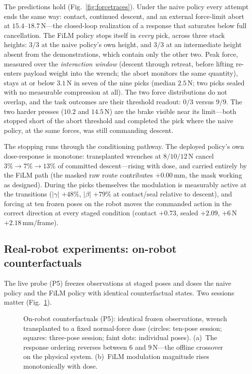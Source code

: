 The predictions hold (Fig.~\ref{fig:forcetraces}). Under the naive policy every attempt ends
the same way: contact, continued descent, and an external force-limit abort at
$15.4$--$18.7$\,N---the closed-loop realization of a response that saturates below full
cancellation. The FiLM policy stops itself in \emph{every} pick, across three stack
heights: $3/3$ at the naive policy's own height, and $3/3$ at an intermediate height absent
from the demonstrations, which contain only the other two. Peak force, measured over the
\emph{interaction window} (descent through retreat, before lifting re-enters payload weight
into the wrench; the abort monitors the same quantity), stays at or below $3.1$\,N in seven of
the nine picks (median $2.5$\,N; two picks sealed with no measurable compression at all). The
two force distributions do not overlap, and the task outcomes are their threshold readout:
$0/3$ versus $9/9$. The two harder presses ($10.2$ and $14.5$\,N) are the brake visible near
its limit---both stopped short of the abort threshold and completed the pick where the naive
policy, at the same forces, was still commanding descent.

The stopping runs through the conditioning pathway. The deployed policy's own dose-response is
monotone: transplanted wrenches at $8/10/12$\,N cancel $3\%\rightarrow7\%\rightarrow13\%$ of
committed descent---rising with dose, and carried entirely by the FiLM path (the masked raw
route contributes $+0.00$\,mm, the mask working as designed). During the picks themselves the
modulation is measurably active at the transitions ($|\gamma|$ $+48\%$, $|\beta|$ $+79\%$ at
contact/seal relative to descent), and forcing \chat{} at ten frozen poses on the robot moves
the commanded action in the correct direction at every staged condition (contact $+0.73$,
sealed $+2.09$, $+6$\,N $+2.18$\,mm/frame).

\subsection{Real-robot experiments: on-robot counterfactuals}
\label{sec:robot-live}

The live probe (P5) freezes observations at staged poses and doses the naive policy and the
FiLM policy with identical counterfactual states. Two sessions matter
(Fig.~\ref{fig:live}).

\begin{figure}[t]
\centering

\caption{On-robot counterfactuals (P5): identical frozen observations, wrench transplanted
to a fixed normal-force dose (circles: ten-pose session; squares: three-pose session; faint
dots: individual poses). (a)~The response ordering reverses between $6$ and $9$\,N---the
offline crossover on the physical system. (b)~FiLM modulation magnitude rises monotonically
with dose.}
\label{fig:live}
\end{figure}

